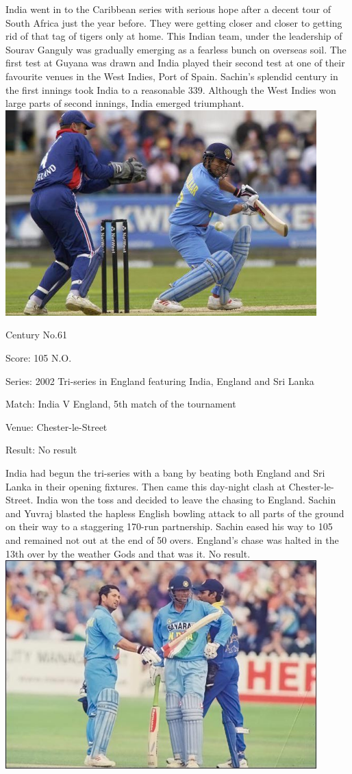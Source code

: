 \documentclass[11pt, a4paper]{article}
\begin{document}
India went in to the Caribbean series with serious hope after a decent tour of South Africa just the year before. They were getting closer and closer to getting rid of that tag of tigers only at home. This Indian team, under the leadership of Sourav Ganguly was gradually emerging as a fearless bunch on overseas soil. The first test at Guyana was drawn and India played their second test at one of their favourite venues in the West Indies, Port of Spain. Sachin's splendid century in the first innings took India to a reasonable 339. Although the West Indies won large parts of second innings, India emerged triumphant.
\newpage
\includegraphics[width=0.9\textwidth]{pics/61.jpg}

Century No.61 

Score: 105 N.O. 

Series: 2002 Tri-series in England featuring India, England and Sri Lanka 

Match: India V England, 5th match of the tournament 

Venue: Chester-le-Street 

Result: No result 

India had begun the tri-series with a bang by beating both England and Sri Lanka in their opening fixtures. Then came this day-night clash at Chester-le-Street. India won the toss and decided to leave the chasing to England. Sachin and Yuvraj blasted the hapless English bowling attack to all parts of the ground on their way to a staggering 170-run partnership. Sachin eased his way to 105 and remained not out at the end of 50 overs. England's chase was halted in the 13th over by the weather Gods and that was it. No result. 
\newpage
\includegraphics[width=0.9\textwidth]{pics/62.jpg}
\end{document}
